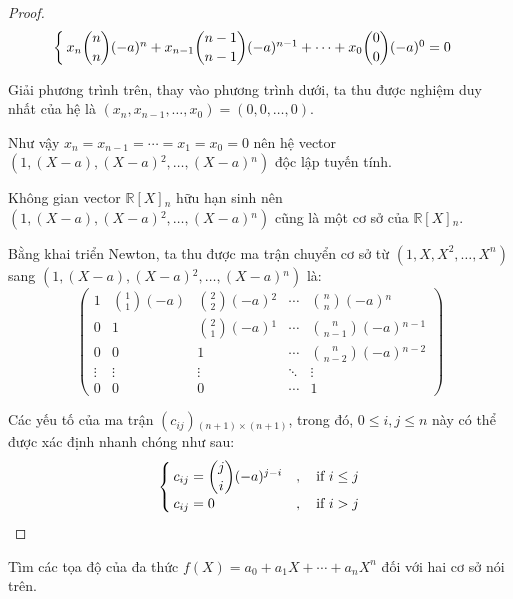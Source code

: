 \documentclass[class=linear-algebra,crop=false]{standalone}
\begin{document}
\begin{proof}
\[\begin{cases}
            x_{n}\dbinom{n}{n}(-a){}^{n} + x_{n-1}\dbinom{n-1}{n-1}(-a){}^{n-1} + \cdots + x_{0}\dbinom{0}{0}(-a){}^{0} = 0
        \end{cases}
    \]
    \par Giải phương trình trên, thay vào phương trình dưới, ta thu được nghiệm duy nhất của hệ là $(x_{n}, x_{n-1},\ldots, x_{0}) = (0,0,\ldots, 0)$.
    \par Như vậy $x_{n} = x_{n-1} = \cdots = x_{1} = x_{0} = 0$ nên hệ vector $(1, (X - a), (X - a){}^{2}, \ldots, (X - a){}^{n})$ độc lập tuyến tính.
    \par Không gian vector $\mathbb{R}[X]{}_{n}$ hữu hạn sinh nên $(1, (X-a), (X-a){}^{2},\ldots, (X-a){}^{n})$ cũng là một cơ sở của $\mathbb{R}[X]{}_{n}$.

    \bigskip
    \par Bằng khai triển Newton, ta thu được ma trận chuyển cơ sở từ $(1, X, X^{2}, \ldots, X^{n})$ sang $(1, (X-a), (X-a){}^{2}, \ldots, (X-a){}^{n})$ là:
    \[
        \begin{pmatrix}
            1      & \binom{1}{1}(-a) & \binom{2}{2}(-a){}^{2} & \cdots & \binom{n}{n}(-a){}^{n}     \\
            0      & 1                & \binom{2}{1}(-a){}^{1} & \cdots & \binom{n}{n-1}(-a){}^{n-1} \\
            0      & 0                & 1                      & \cdots & \binom{n}{n-2}(-a){}^{n-2} \\
            \vdots & \vdots           & \vdots                 & \ddots & \vdots                     \\
            0      & 0                & 0                      & \cdots & 1
        \end{pmatrix}
    \]
    \par Các yếu tố của ma trận $(c_{ij}){}_{(n+1)\times(n+1)}$, trong đó, $0\le i, j \le n$ này có thể được xác định nhanh chóng như sau:
    \[
        \begin{cases}
            c_{ij} = \dbinom{j}{i}(-a){}^{j - i} & ,\quad\text{if $i\le j$} \\
            c_{ij} = 0                           & ,\quad\text{if $i > j$}
        \end{cases}
    \]
\end{proof}

\begin{exercise}Tìm các tọa độ của đa thức $f(X) = a_{0} + a_{1}X + \cdots + a_{n}X^{n}$ đối với hai cơ sở nói trên.
\end{exercise}
\end{document}
